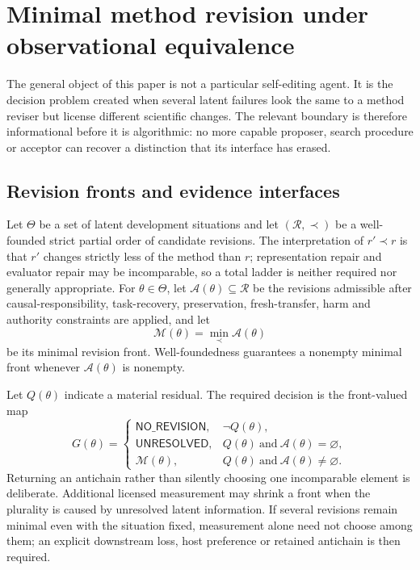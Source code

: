 \section{Minimal method revision under observational equivalence}
\label{sec:minimal-revision-theory}

The general object of this paper is not a particular self-editing agent. It is
the decision problem created when several latent failures look the same to a
method reviser but license different scientific changes. The relevant boundary
is therefore informational before it is algorithmic: no more capable proposer,
search procedure or acceptor can recover a distinction that its interface has
erased.

\subsection{Revision fronts and evidence interfaces}

Let $\Theta$ be a set of latent development situations and let
$(\mathcal R,\prec)$ be a well-founded strict partial order of candidate
revisions. The interpretation of $r'\prec r$ is that $r'$ changes strictly less
of the method than $r$; representation repair and evaluator repair may be
incomparable, so a total ladder is neither required nor generally appropriate.
For $\theta\in\Theta$, let $\mathcal A(\theta)\subseteq\mathcal R$ be the
revisions admissible after causal-responsibility, task-recovery, preservation,
fresh-transfer, harm and authority constraints are applied, and let
\[
  \mathcal M(\theta)=\min_{\prec}\mathcal A(\theta)
\]
be its minimal revision front. Well-foundedness guarantees a nonempty minimal
front whenever $\mathcal A(\theta)$ is nonempty.

Let $Q(\theta)$ indicate a material residual. The required decision is the
front-valued map
\[
G(\theta)=
\begin{cases}
\mathsf{NO\_REVISION}, & \neg Q(\theta),\\
\mathsf{UNRESOLVED}, & Q(\theta)\ \text{and}\ \mathcal A(\theta)=\varnothing,\\
\mathcal M(\theta), & Q(\theta)\ \text{and}\ \mathcal A(\theta)\ne\varnothing.
\end{cases}
\]
Returning an antichain rather than silently choosing one incomparable element
is deliberate. Additional licensed measurement may shrink a front when the
plurality is caused by unresolved latent information. If several revisions
remain minimal even with the situation fixed, measurement alone need not choose
among them; an explicit downstream loss, host preference or retained antichain
is then required.

